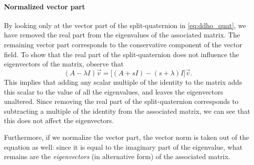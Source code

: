 \paragraph{Normalized vector part} 
By looking only at the vector part of the split-quaternion in \cref{eq:ddho_quat}, we have removed the real part from the eigenvalues of the associated matrix. The remaining vector part corresponds to the conservative component of the vector field. To show that the real part of the split-quaternion does not influence the eigenvectors of the matrix, observe that
\begin{equation}
     (A - \lambda I)\vec{v} = \big[(A + s I)  - (s + \lambda) I\big]\vec{v}.
     \label{eq:eigvec_realpart}
\end{equation}
This implies that adding any scalar multiple of the identity to the matrix adds this scalar to the value of all the eigenvalues, and leaves the eigenvectors unaltered. Since removing the real part of the split-quaternion corresponds to subtracting a multiple of the identity from the associated matrix, we can see that this does not affect the eigenvectors.

Furthermore, if we normalize the vector part, the vector norm is taken out of the equation as well: since it is equal to the imaginary part of the eigenvalue, what remains are the \emph{eigenvectors} (in alternative form) of the associated matrix.

